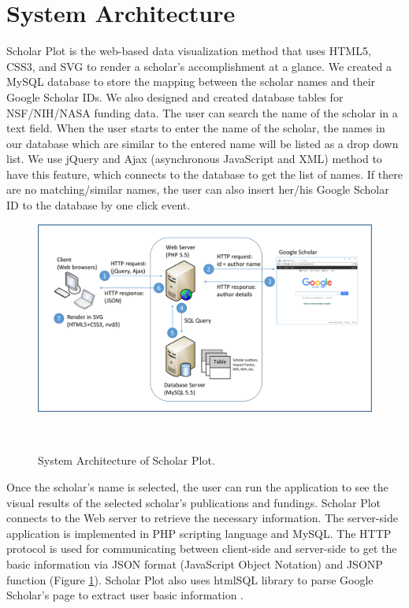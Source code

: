 \section{System Architecture}


Scholar Plot is the web-based data visualization method that uses HTML5, CSS3, and SVG to render a scholar's accomplishment at a glance. We created a MySQL database to store the mapping between the scholar names and their Google Scholar IDs. We also designed and created database tables for NSF/NIH/NASA funding data. The user can search the name of the scholar in a text field. When the user starts to enter the name of the scholar, the names in our database which are similar to the entered name will be listed as a drop down list. We use jQuery and Ajax (asynchronous JavaScript and XML) method to have this feature, which connects to the database to get the list of names. If there are no matching/similar names, the user can also insert her/his Google Scholar ID to the database by one click event.

\begin{figure}[H]
\centering
  \includegraphics[width=1\textwidth]{figures/fig_system_architecture.pdf}
  \caption{System Architecture of Scholar Plot.}~\label{fig-arch}
\end{figure}

Once the scholar's name is selected, the user can run the application to see the visual results of the selected scholar's publications and fundings. Scholar Plot connects to the Web server to retrieve the necessary information.
The server-side application is implemented in PHP scripting language and MySQL. The HTTP protocol is used for communicating between client-side and server-side to get the basic information via JSON format (JavaScript Object Notation) and JSONP function (Figure \ref{fig-arch}). Scholar Plot also uses htmlSQL library to parse Google Scholar's page to extract user basic information \cite{htmlSQL}.

